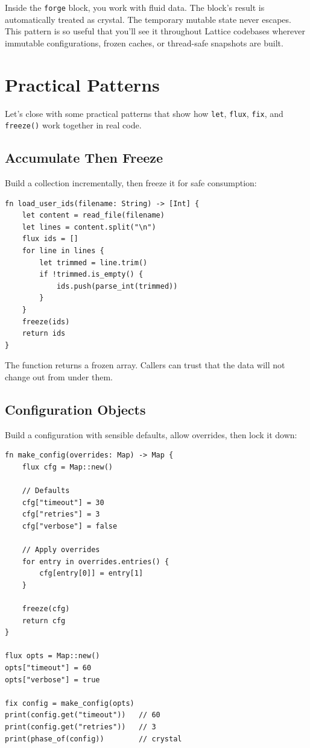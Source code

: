 Inside the \lstinline|forge| block, you work with fluid data.
The block's result is automatically treated as crystal.
The temporary mutable state never escapes.
This pattern is so useful that you'll see it throughout Lattice codebases wherever immutable configurations, frozen caches, or thread-safe snapshots are built.

\section{Practical Patterns}\label{sec:variable-patterns}

Let's close with some practical patterns that show how \lstinline|let|, \lstinline|flux|, \lstinline|fix|, and \lstinline|freeze()| work together in real code.

\subsection{Accumulate Then Freeze}\label{subsec:accumulate-freeze}

Build a collection incrementally, then freeze it for safe consumption:

\begin{lstlisting}[language=Lattice, caption={Accumulate then freeze}]
fn load_user_ids(filename: String) -> [Int] {
    let content = read_file(filename)
    let lines = content.split("\n")
    flux ids = []
    for line in lines {
        let trimmed = line.trim()
        if !trimmed.is_empty() {
            ids.push(parse_int(trimmed))
        }
    }
    freeze(ids)
    return ids
}
\end{lstlisting}

The function returns a frozen array.
Callers can trust that the data will not change out from under them.

\subsection{Configuration Objects}\label{subsec:config-objects}

Build a configuration with sensible defaults, allow overrides, then lock it down:

\begin{lstlisting}[language=Lattice, caption={Configuration with defaults}]
fn make_config(overrides: Map) -> Map {
    flux cfg = Map::new()

    // Defaults
    cfg["timeout"] = 30
    cfg["retries"] = 3
    cfg["verbose"] = false

    // Apply overrides
    for entry in overrides.entries() {
        cfg[entry[0]] = entry[1]
    }

    freeze(cfg)
    return cfg
}

flux opts = Map::new()
opts["timeout"] = 60
opts["verbose"] = true

fix config = make_config(opts)
print(config.get("timeout"))   // 60
print(config.get("retries"))   // 3
print(phase_of(config))        // crystal
\end{lstlisting}

